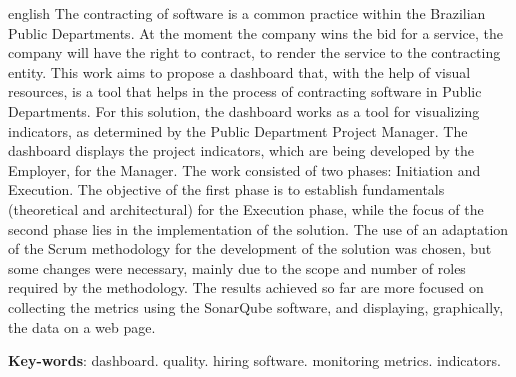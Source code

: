 \begin{resumo}[Abstract]
 \begin{otherlanguage*}{english}
   The contracting of software is a common practice within the Brazilian Public Departments. At the moment the company wins the bid for a service, the company will have the right to contract, to render the service to the contracting entity. This work aims to propose a dashboard that, with the help of visual resources, is a tool that helps in the process of contracting software in Public Departments. For this solution, the dashboard works as a tool for visualizing indicators, as determined by the Public Department Project Manager. The dashboard displays the project indicators, which are being developed by the Employer, for the Manager. The work consisted of two phases: Initiation and Execution. The objective of the first phase is to establish fundamentals (theoretical and architectural) for the Execution phase, while the focus of the second phase lies in the implementation of the solution. The use of an adaptation of the Scrum methodology for the development of the solution was chosen, but some changes were necessary, mainly due to the scope and number of roles required by the methodology. The results achieved so far are more focused on collecting the metrics using the SonarQube software, and displaying, graphically, the data on a web page.

   \vspace{\onelineskip}
 
   \noindent 
   \textbf{Key-words}: dashboard. quality. hiring software. monitoring metrics. indicators.
 \end{otherlanguage*}
\end{resumo}
